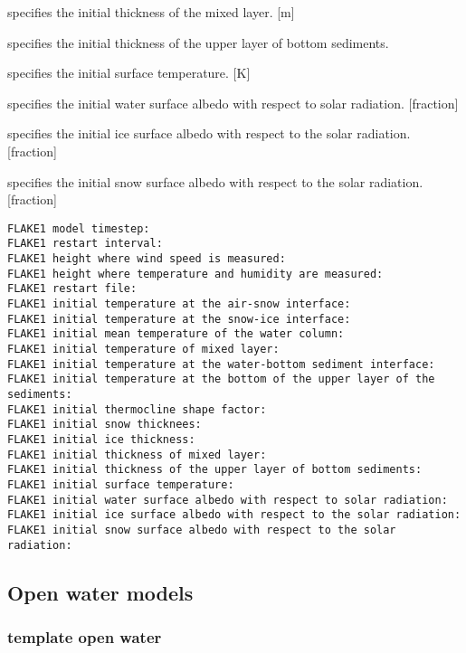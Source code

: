   specifies the
 initial thickness of the mixed layer. [m]

 specifies the initial thickness of the upper layer of bottom sediments.

  specifies the
 initial surface temperature. [K]

 specifies the initial water surface albedo with respect to solar
 radiation. [fraction]

 specifies the initial ice surface albedo with respect to the solar
 radiation. [fraction]

 specifies the initial snow surface albedo with respect to the solar
 radiation. [fraction]
 

 \begin{Verbatim}[frame=single]
FLAKE1 model timestep:
FLAKE1 restart interval:
FLAKE1 height where wind speed is measured:
FLAKE1 height where temperature and humidity are measured:
FLAKE1 restart file:
FLAKE1 initial temperature at the air-snow interface:
FLAKE1 initial temperature at the snow-ice interface:
FLAKE1 initial mean temperature of the water column:
FLAKE1 initial temperature of mixed layer:
FLAKE1 initial temperature at the water-bottom sediment interface:
FLAKE1 initial temperature at the bottom of the upper layer of the sediments:
FLAKE1 initial thermocline shape factor:
FLAKE1 initial snow thicknees:
FLAKE1 initial ice thickness:
FLAKE1 initial thickness of mixed layer:
FLAKE1 initial thickness of the upper layer of bottom sediments:
FLAKE1 initial surface temperature:
FLAKE1 initial water surface albedo with respect to solar radiation:
FLAKE1 initial ice surface albedo with respect to the solar radiation:
FLAKE1 initial snow surface albedo with respect to the solar radiation:
 \end{Verbatim}
 

 
 
 \subsection{Open water models} \label{ssec:openwater}
 

 
 \subsubsection{template open water}
 \label{sssec:templateopenwater}
 

